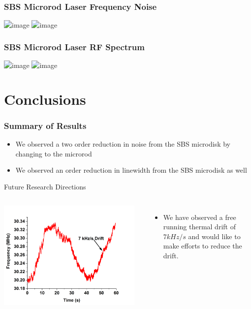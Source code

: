 \documentclass{beamer}
\begin{document}
\begin{frame}\frametitle{SBS Microrod Laser Frequency Noise}
\includegraphics<1>[width=1.0\textwidth]{Images/Freq_Noise_Comparison_Plot1.png}
\includegraphics<2>[width=1.0\textwidth]{Images/Freq_Noise_Comparison_Plot2.png}
\end{frame}

\begin{frame}\frametitle{SBS Microrod Laser RF Spectrum}
\includegraphics<1>[width=1.0\textwidth]{Images/RF_Spectrum_Plot1.png}
\includegraphics<2>[width=1.0\textwidth]{Images/RF_Spectrum_Plot2.png}
\end{frame}

\section{Conclusions}
\begin{frame}\frametitle{Summary of Results}
\begin{itemize}
\item We observed a two order reduction in noise from the SBS microdisk by changing to the microrod
\item We observed an order reduction in linewidth from the SBS microdisk as well
\end{itemize}

\begin{block}{Future Research Directions}
\begin{columns}
\includegraphics[width=0.95\textwidth]{Images/Thermal_Drift.png}
\begin{itemize}
\item We have observed a free running thermal drift of $7kHz/s$ and would like to make efforts to reduce the drift.
\end{itemize}
\end{columns}

\end{block}
\end{frame}
\end{document}

